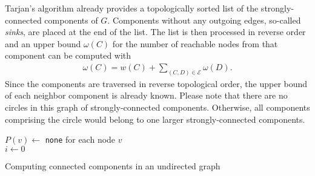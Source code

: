 Tarjan's algorithm already provides a topologically sorted list of the strongly-connected components of $G$. Components without any outgoing edges, so-called \emph{sinks}, are placed at the end of the list. The list is then processed in reverse order and an upper bound $\omega(C)$ for the number of reachable nodes from that component can be computed with 
 \begin{align*}
 	\omega(C) = w(C) + \sum_{(C, D) \in \mathcal{E}}{\omega(D)}.
 \end{align*}
Since the components are traversed in reverse topological order, the upper bound of each neighbor component is already known. Please note that there are no circles in this graph of strongly-connected components. Otherwise, all components comprising the circle would belong to one larger strongly-connected components.

\begin{algorithm2e}[h!]
 \label{alg:connectedComponents}
 $P(v) \gets$ \texttt{none} for each node $v$ \\
 $i \gets 0$ \\
 
 
 
 \caption{Computing connected components in an undirected graph}
\end{algorithm2e}


